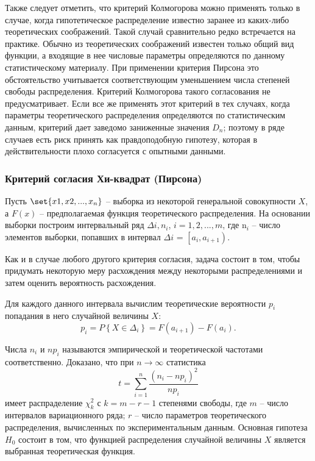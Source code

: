 \documentclass[11pt]{article}
\begin{document}
Также следует отметить, что критерий Колмогорова можно применять только
в случае, когда гипотетическое распределение известно заранее из
каких-либо теоретических соображений. Такой случай сравнительно редко
встречается на практике. Обычно из теоретических соображений известен
только общий вид функции, а входящие в нее числовые параметры
определяются по данному статистическому материалу. При применении
критерия Пирсона это обстоятельство учитывается соответствующим
уменьшением числа степеней свободы распределения. Критерий Колмогорова
такого согласования не предусматривает. Если все же применять этот
критерий в тех случаях, когда параметры теоретического распределения
определяются по статистическим данным, критерий дает заведомо заниженные
значения \(D_n\); поэтому в ряде случаев есть риск принять как
правдоподобную гипотезу, которая в действительности плохо согласуется с
опытными данными.

\subsubsection{Критерий согласия Хи-квадрат
(Пирсона)}\label{ux43aux440ux438ux442ux435ux440ux438ux439-ux441ux43eux433ux43bux430ux441ux438ux44f-ux445ux438-ux43aux432ux430ux434ux440ux430ux442-ux43fux438ux440ux441ux43eux43dux430}

Пусть \(\set{x1 , x2 , ..., x_n}\) -- выборка из некоторой генеральной
совокупности \(X\), а \(F(x)\) -- предполагаемая функция теоретического
распределения. На основании выборки построим интервальный ряд
\({\Delta i , n_i}\), \(i=1,2,...,m\), где n\(_i\) -- число элементов
выборки, попавших в интервал \(\Delta i\) =
\(\left[a_i,a_{i+1}\right)\).

Как и в случае любого другого критерия согласия, задача состоит в том,
чтобы придумать некоторую меру расхождения между некоторыми
распределениями и затем оценить вероятность расхождения.

Для каждого данного интервала вычислим теоретические вероятности \(p_i\)
попадания в него случайной величины \(X\): \[
p_i = P\left\{X \in \Delta_i \right\} = F\left(a_{i+1}\right) − F\left(a_i\right).
\]

Числа \(n_i\) и \(np_i\) называются эмпирической и теоретической
частотами соответственно. Доказано, что при \(n \to \infty\) статистика
\[
t = \sum_{i=1}^{n}{\frac{\left(n_i - np_i\right)^2}{np_i}}
\] имеет распраделение \(\chi_k^2\) с \(k = m - r - 1\) степенями
свободы, где \(m\) -- число интервалов вариационного ряда; \(r\) --
число параметров теоретического распределения, вычисленных по
экспериментальным данным. Основная гипотеза \(H_0\) состоит в том, что
функцией распределения случайной величины \(X\) является выбранная
теоретическая функция.
\end{document}
